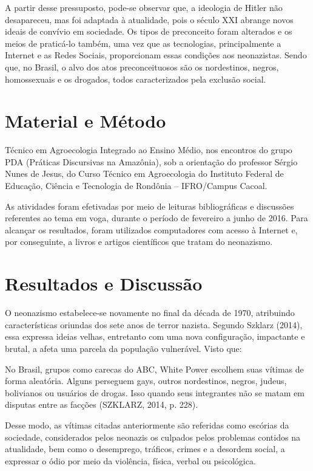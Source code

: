 \documentclass[article,12pt,onesidea,4paper,english,brazil]{abntex2}
\begin{document}
A partir desse pressuposto, pode-se observar que, a ideologia de Hitler não desapareceu, mas foi adaptada à atualidade, pois o século XXI abrange novos ideais de convívio em sociedade. Os tipos de preconceito foram alterados e os meios de praticá-lo também, uma vez que as tecnologias, principalmente a Internet e as Redes Sociais, proporcionam essas condições aos neonazistas. Sendo que, no Brasil, o alvo dos atos preconceituosos são os nordestinos, negros, homossexuais e os drogados, todos caracterizados pela exclusão social.
	
	\section*{Material e Método}
	
	Técnico em Agroecologia Integrado ao Ensino Médio, nos encontros do grupo PDA (Práticas Discursivas na Amazônia), sob a orientação do professor Sérgio Nunes de Jesus, do Curso Técnico em Agroecologia do Instituto Federal de Educação, Ciência e Tecnologia de Rondônia – IFRO/Campus Cacoal.
	
	As atividades foram efetivadas por meio de leituras bibliográficas e discussões referentes ao tema em voga, durante o período de fevereiro a junho de 2016. Para alcançar os resultados, foram utilizados computadores com acesso à Internet e, por conseguinte, a livros e artigos científicos que tratam do neonazismo.
	
	\section*{Resultados e Discussão}
	
	O neonazismo estabelece-se novamente no final da década de 1970, atribuindo características oriundas dos sete anos de terror nazista. Segundo Szklarz (2014), essa expressa ideias velhas, entretanto com uma nova configuração, impactante e brutal, a afeta uma parcela da população vulnerável. Visto que: 
	
	\begin{citacao}
		No Brasil, grupos como carecas do ABC, White Power escolhem suas vítimas de forma aleatória. Alguns perseguem gays, outros nordestinos, negros, judeus, bolivianos ou usuários de drogas. Isso quando seus integrantes não se matam em disputas entre as facções (SZKLARZ, 2014, p. 228).
	\end{citacao}
	
	Desse modo, as vítimas citadas anteriormente são referidas como escórias da sociedade, considerados pelos neonazis os culpados pelos problemas contidos na atualidade, bem como o desemprego, tráficos, crimes e a desordem social, a expressar o ódio por meio da violência, física, verbal ou psicológica.
	
\end{document}
